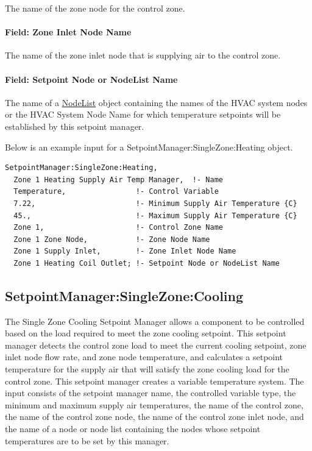 The name of the zone node for the control zone.

\paragraph{Field: Zone Inlet Node Name}\label{field-zone-inlet-node-name-1}

The name of the zone inlet node that is supplying air to the control zone.

\paragraph{Field: Setpoint Node or NodeList Name}\label{field-setpoint-node-or-nodelist-name-4}

The name of a \hyperref[nodelist]{NodeList} object containing the names of the HVAC system nodes or the HVAC System Node Name for which temperature setpoints will be established by this setpoint manager.

Below is an example input for a SetpointManager:SingleZone:Heating object.

\begin{lstlisting}
SetpointManager:SingleZone:Heating,
  Zone 1 Heating Supply Air Temp Manager,  !- Name
  Temperature,                !- Control Variable
  7.22,                       !- Minimum Supply Air Temperature {C}
  45.,                        !- Maximum Supply Air Temperature {C}
  Zone 1,                     !- Control Zone Name
  Zone 1 Zone Node,           !- Zone Node Name
  Zone 1 Supply Inlet,        !- Zone Inlet Node Name
  Zone 1 Heating Coil Outlet; !- Setpoint Node or NodeList Name
\end{lstlisting}

\subsection{SetpointManager:SingleZone:Cooling}\label{setpointmanagersinglezonecooling}

The Single Zone Cooling Setpoint Manager allows a component to be controlled based on the load required to meet the zone cooling setpoint. This setpoint manager detects the control zone load to meet the current cooling setpoint, zone inlet node flow rate, and zone node temperature, and calculates a setpoint temperature for the supply air that will satisfy the zone cooling load for the control zone. This setpoint manager creates a variable temperature system. The input consists of the setpoint manager name, the controlled variable type, the minimum and maximum supply air temperatures, the name of the control zone, the name of the control zone node, the name of the control zone inlet node, and the name of a node or node list containing the nodes whose setpoint temperatures are to be set by this manager.

